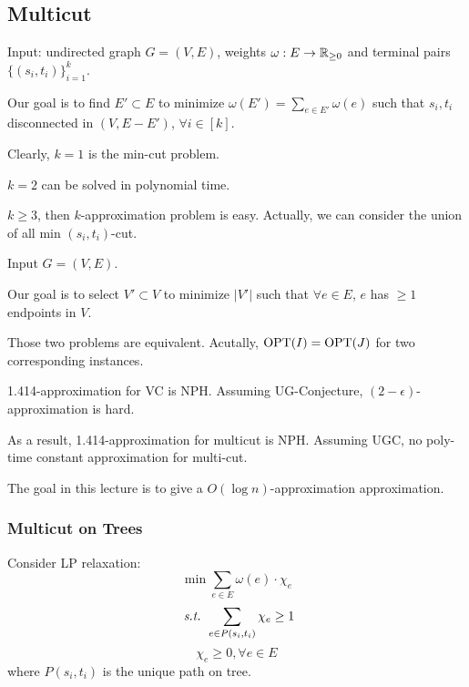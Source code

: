 
\subsection{Multicut}
\begin{example}[Multicut]
    Input: undirected graph  $ G=(V,E) $, weights  $ \omega:E\rightarrow\mathbb R_{ \geq 0} $ and terminal pairs  $ \{(s_i,t_i)\}_{i=1}^k $.
    
    Our goal is to find  $ E'\subset E $ to  minimize  $ \omega(E')=\sum_{e\in E'}\omega(e) $ such that  $ s_i,t_i $ disconnected in  $ (V,E-E') $,  $ \forall i\in [k] $.     
\end{example}

Clearly,  $ k=1 $ is the min-cut problem.

\begin{theorem}
    $ k=2 $ can be solved in polynomial time. 
\end{theorem}
\begin{fact}
    $ k \geq 3 $, then  $ k $-approximation problem is easy. Actually, we can consider the union of all  min $ (s_i,t_i) $-cut.  
\end{fact}

\begin{example}
    Input  $ G=(V,E) $.

    Our goal is to select  $ V'\subset V  $ to minimize  $ |V'| $ such that  $ \forall e\in E $,  $ e  $ has  $  \geq 1 $ endpoints in  $ V $.    
\end{example}

Those two problems are equivalent. Acutally,  $ \mathrm{OPT}(I)=\mathrm{OPT}(J) $ for two corresponding instances.


\begin{theorem}
    1.414-approximation for VC is NPH. Assuming UG-Conjecture,  $ (2-\epsilon) $-approximation is hard.

    As a result, 1.414-approximation for multicut is NPH. Assuming UGC, no poly-time constant approximation for multi-cut.
\end{theorem}

The goal in this lecture is to give a  $ O(\log n) $-approximation approximation. 

\subsubsection{Multicut on Trees}
Consider LP relaxation:
\[\min \sum_{e\in E }\omega(e)\cdot\chi_e\]
\[\textit{ s.t. } \sum_{e\in P(s_i,t_i)}\chi_e \geq 1\]
\[\chi_e \geq 0,\forall e\in E\]
where  $ P(s_i,t_i) $  is the unique path on tree.

